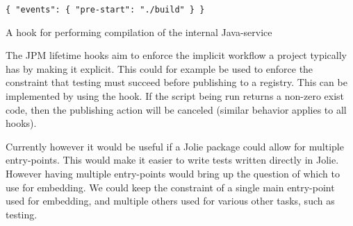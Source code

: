 \begin{listing}[H]
\begin{verbatim}
{ "events": { "pre-start": "./build" } }
\end{verbatim}
\caption{A  hook for performing compilation of the internal
    Java-service}
\label{lst:pre_start_hook}
\end{listing}

The JPM lifetime hooks aim to enforce the implicit workflow a project typically
has by making it explicit. This could for example be used to enforce the
constraint that testing must succeed before publishing to a registry. This can
be implemented by using the  hook. If the script being run
returns a non-zero exist code, then the publishing action will be canceled
(similar behavior applies to all  hooks).

Currently however it would be useful if a Jolie package could allow for
multiple entry-points. This would make it easier to write tests written
directly in Jolie. However having multiple entry-points would bring up the
question of which to use for embedding. We could keep the constraint of a
single main entry-point used for embedding, and multiple others used for
various other tasks, such as testing.
